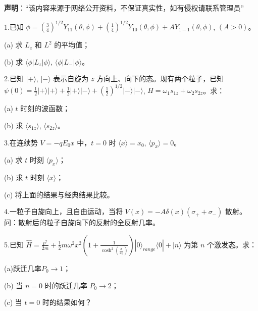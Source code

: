 
\textbf{声明}：“该内容来源于网络公开资料，不保证真实性，如有侵权请联系管理员”

1.已知 $\phi = \left(\frac{3}{4}\right)^{1/2} Y_{11}(\theta, \phi) + \left(\frac{1}{4}\right)^{1/2} Y_{10}(\theta, \phi) + A Y_{1-1}(\theta, \phi)$, $(A > 0)$。

(a) 求 $L_z$ 和 $L^2$ 的平均值；

(b) 求 $\langle \phi | L_z | \phi \rangle$, $\langle \phi | L_- | \phi \rangle$。

2.已知 $|+\rangle$, $|-\rangle$ 表示自旋为 $z$ 方向上、向下的态。现有两个粒子，已知 $\psi(0) = \frac{1}{2} |+\rangle |+\rangle + \frac{1}{2} |+\rangle |-\rangle + (\frac{1}{2})^{1/2} |-\rangle |-\rangle$, $H = \omega_1 s_{1z} + \omega_2 s_{2z}$。求：

(a) $t$ 时刻的波函数；

(b) 求 $\langle s_{1z} \rangle$, $\langle s_{2z} \rangle$。

3.在连续势 $V = -q E_0 x$ 中，$t = 0$ 时 $\langle x \rangle = x_0$, $\langle p_x \rangle = 0$。

(a) 求 $t$ 时刻 $\langle p_x \rangle$；

(b) 求 $t$ 时刻 $\langle x \rangle$；

(c) 将上面的结果与经典结果比较。

4.一粒子自旋向上，且自由运动，当将 $V(x) = -A \delta(x)(\sigma_+ + \sigma_-)$ 散射。问：散射后的粒子自旋向下的反射的全反射几率。

5.已知 $\hat{H} = \frac{p^2}{2m} + \frac{1}{2} m \omega^2 x^2 \left(1 + \frac{1}{\cosh^2(\frac{x}{x_0})}\right) |0\rangle_{range} \langle 0| + |n\rangle$ 为第 $n$ 个激发态。求：

(a)跃迁几率$P_0\to 1$；

(b)  当 $n = 0$ 时的跃迁几率 $P_0 \to 2$；

(c) 当 $t = 0$ 时的结果如何？

